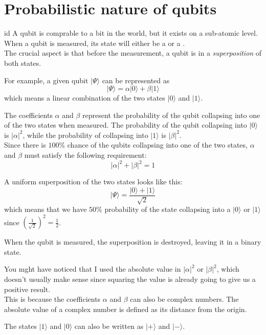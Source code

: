 \documentclass[preview]{standalone}
\begin{document}
\genpage

\section{Probabilistic nature of qubits}

\begin{snippet}{id}
    A qubit is comprable to a bit in the  world, but it exists on a sub-atomic level. \\
    When a qubit is measured, its state will either be a  or a . \\
    The crucial aspect is that before the measurement, a qubit is in a \textit{superposition} of both states.
    
    For example, a given qubit \(|\Psi\rangle\) can be represented as
    \[
        |\Psi\rangle=\alpha |0\rangle+\beta |1\rangle
    \]
    which means a linear combination of the two states \(|0\rangle\) and \(|1\rangle\).
    
    The coefficients \(\alpha\) and \(\beta\) represent the probability of the qubit collapsing into one of the two states when measured.
    The probability of the qubit collapsing into \(|0\rangle\) is \(|\alpha|^2\),
    while the probability of collapsing into \(|1\rangle\) is \(|\beta|^2\). \\
    Since there is \(100\%\) chance of the qubits collapsing into one of the two states, \(\alpha\) and \(\beta\) must satisfy the following requirement:
    \[
        |\alpha|^2+|\beta|^2=1
    \]
    
    A uniform superposition of the two states looks like this:
    \[
        |\Psi\rangle=\frac{|0\rangle+|1\rangle}{\sqrt{2}}
    \]
    which means that we have \(50\%\) probability of the state collapsing into a \(|0\rangle\) or \(|1\rangle\)
    since \({\left(\frac{1}{\sqrt{2}}\right)}^2=\frac{1}{2}\).
    
    When the qubit is measured, the superposition is destroyed, leaving it in a  binary state.
    
    You mght have noticed that I used the absolute value in \(|\alpha|^2\) or \(|\beta|^2\), which doesn't usually make sense since squaring the value is already going to give us a positive result.
    \\
    This is because the coefficients \(\alpha\) and \(\beta\) can also be complex numbers. The absolute value of a complex number is defined as its distance from the origin.
    
    The states \(|1\rangle\) and \(|0\rangle\) can also be written as \(|+\rangle\) and \(|-\rangle\).
\end{snippet}
\end{document}
